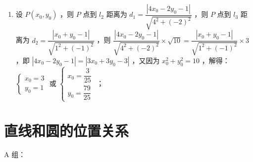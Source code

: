 \begin{enumerate}
\begin{jieda}
\begin{enumerate}
            \item 设 $P\left(x_0, y_0\right)$ ，则 $P$ 点到 $l_2$ 距离为 $d_1=\dfrac{\left|4 x_0-2 y_0-1\right|}{\sqrt{4^2+(-2)^2}}$ ，则 $P$ 点到 $l_3$ 距离为 $d_2=\dfrac{\left|x_0+y_0-1\right|}{\sqrt{1^2+(-1)^2}}$ ，则 $\dfrac{\left|4 x_0-2 y_0-1\right|}{\sqrt{4^2+(-2)^2}} \times \sqrt{10}=\dfrac{\left|x_0+y_0-1\right|}{\sqrt{1^2+(-1)^2}} \times 3$ ，即 $\left|4 x_0-2 y_0-1\right|=\left|3 x_0+3 y_0-3\right|$ ，又因为 $x_0^2+y_0^2=10$ ，解得：$\left\{\begin{array}{l}x_0=3 \\ y_0=1\end{array}\right.$ 或 $\left\{\begin{array}{l}x_0=\dfrac{3}{25} \\ y_0=\dfrac{79}{25}\end{array}\right.$ ；
        \end{enumerate}

    \end{jieda}
    
\end{enumerate}

\clearpage
\section*{直线和圆的位置关系}

A 组：

